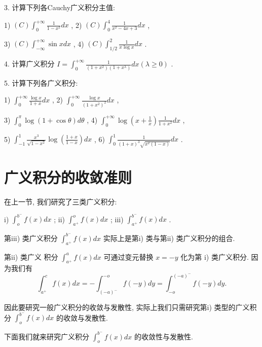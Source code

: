 3. 计算下列各Cauchy广义积分主值:

1) $\left( C\right) {\int }_{0}^{+\infty }\frac{1}{1 - {x}^{2}}{dx}$ , 2) $\left( C\right) {\int }_{0}^{4}\frac{1}{{x}^{2} - {4x} + 3}{dx}$ ,

3) $\left( C\right) {\int }_{-\infty }^{+\infty }\sin {xdx}$ , 4) $\left( C\right) {\int }_{1/2}^{2}\frac{1}{x\log x}{dx}$ .

4. 计算广义积分 $I = {\int }_{0}^{+\infty }\frac{1}{\left( {1 + {x}^{2}}\right) \left( {1 + {x}^{\lambda }}\right) }{dx}\left( {\lambda  \geq  0}\right)$ .

5. 计算下列各广义积分:

1) ${\int }_{0}^{+\infty }\frac{\log x}{1 + x}{dx}$ , 2) ${\int }_{0}^{+\infty }\frac{\log x}{{\left( 1 + {x}^{2}\right) }^{2}}{dx}$ ,

3) ${\int }_{0}^{\pi }\log \left( {1 + \cos \theta }\right) {d\theta }$ , 4) ${\int }_{0}^{+\infty }\log \left( {x + \frac{1}{x}}\right) \frac{1}{1 + {x}^{2}}{dx}$ ,

5) ${\int }_{-1}^{1}\frac{{x}^{3}}{\sqrt{1 - {x}^{2}}}\log \left( \frac{1 + x}{1 - x}\right) {dx}$ , 6) ${\int }_{0}^{1}\frac{1}{{\left( 1 + x\right) }^{3}\sqrt{{x}^{2}\left( {1 - x}\right) }}{dx}$ .

\section{广义积分的收敛准则}

在上一节, 我们研究了三类广义积分:

i) ${\int }_{o}^{{b}^{ - }}f\left( x\right) {dx}$ ; ii) ${\int }_{{a}^{ + }}^{o}f\left( x\right) {dx}$ ; iii) ${\int }_{{a}^{ + }}^{{b}^{ - }}f\left( x\right) {dx}$ .

第iii) 类广义积分 ${\int }_{{a}^{ + }}^{{b}^{ - }}f\left( x\right) {dx}$ 实际上是第i) 类与第ii) 类广义积分的组合.

第ii) 类广义 积分 ${\int }_{{a}^{ + }}^{a}f\left( x\right) {dx}$ 可通过变元替换 $x =  - y$ 化为第 i) 类广义积分. 因为我们有
$${\int }_{{a}^{ + }}^{c}f\left( x\right) {dx} =  - {\int }_{{\left( -a\right) }^{ - }}^{-o}f\left( {-y}\right) {dy} = {\int }_{-o}^{{\left( -a\right) }^{ - }}f\left( {-y}\right) {dy}.$$

因此要研究一般广义积分的收敛与发散性, 实际上我们只需研究第i) 类型的广义积分 ${\int }_{o}^{{b}^{ - }}f\left( x\right) {dx}$ 的收敛与发散性.

下面我们就来研究广义积分 ${\int }_{o}^{{b}^{ - }}f\left( x\right) {dx}$ 的收敛性与发散性.


